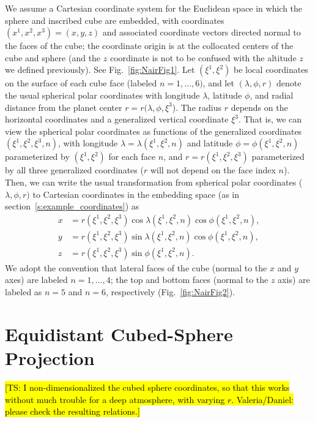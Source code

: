 \documentclass{report}
\begin{document}
We assume a Cartesian coordinate system for the Euclidean space in which the sphere and inscribed cube are embedded, with coordinates $(x^1, x^2, x^3) = (x, y, z)$ and associated coordinate vectors directed normal to the faces of the cube; the coordinate origin is at the collocated centers of the cube and sphere (and the $z$ coordinate is not to be confused with the altitude $z$ we defined previously). See Fig.~\ref{fig:NairFig1}. Let $(\xi^1, \xi^2)$ be local coordinates on the surface of each cube face (labeled $n=1,\dots, 6)$,  and let $(\lambda, \phi, r)$ denote the usual spherical polar coordinates with longitude  $\lambda$, latitude $\phi$, and radial distance from the planet center $r=r(\lambda, \phi, \xi^3$). The radius $r$ depends on the horizontal coordinates and a generalized vertical coordinate $\xi^3$. That is, we can view the spherical polar coordinates as functions of the generalized coordinates $(\xi^1, \xi^2, \xi^3, n)$, with longitude $\lambda = \lambda(\xi^1, \xi^2, n)$ and latitude $\phi = \phi(\xi^1, \xi^2, n)$ parameterized by $(\xi^1, \xi^2)$ for each face $n$, and $r = r(\xi^1, \xi^2, \xi^3)$ parameterized by all three generalized coordinates ($r$ will not depend on the face index $n$). Then, we can write the usual transformation from spherical polar coordinates ($\lambda, \phi, r)$ to Cartesian coordinates in the embedding space (as in section~\ref{s:example_coordinates}) as
\begin{subequations} \label{eq:spherical-coords-terrain-follow}
    \begin{align}
    x &= r(\xi^1, \xi^2, \xi^3) \cos \lambda(\xi^1, \xi^2, n) \cos \phi(\xi^1, \xi^2, n) , \\
    y &= r(\xi^1, \xi^2, \xi^3) \sin \lambda(\xi^1, \xi^2, n) \cos \phi(\xi^1, \xi^2, n) , \\
    z &= r(\xi^1, \xi^2, \xi^3) \sin \phi(\xi^1, \xi^2, n).
    \end{align}
\end{subequations}
We adopt the convention that lateral faces of the cube (normal to the $x$ and $y$ axes) are labeled $n=1, \dots, 4$; the top and bottom faces (normal to the $z$ axis) are labeled as $n=5$ and $n=6$, respectively (Fig.~\ref{fig:NairFig2}).

\section{Equidistant Cubed-Sphere Projection}\label{s:cubed_sphere_transform}

\hl{[TS: I non-dimensionalized the cubed sphere coordinates, so that this works without much trouble for a deep atmosphere, with varying $r$. Valeria/Daniel: please check the resulting relations.]}
\end{document}
